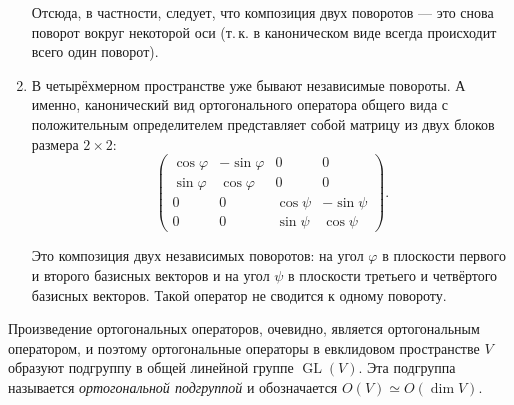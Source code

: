 \begin{example}
\begin{enumerate}
            Отсюда, в частности, следует, что композиция двух поворотов --- это снова поворот вокруг некоторой оси (т.\,к. в каноническом виде всегда происходит всего один поворот).
        \item В четырёхмерном пространстве уже бывают независимые повороты. А именно, канонический вид ортогонального оператора общего вида с положительным определителем представляет собой матрицу из двух блоков размера $2 \times 2$:
            \[
                \begin{pmatrix}
                    \cos\varphi & -\sin\varphi & 0 & 0\\
                    \sin\varphi & \cos\varphi & 0 & 0\\
                    0 & 0 & \cos\psi & -\sin\psi\\
                    0 & 0 & \sin\psi & \cos\psi
                \end{pmatrix}.
            \]

            Это композиция двух независимых поворотов: на угол $\varphi$ в плоскости первого и второго базисных векторов и на угол $\psi$ в плоскости третьего и четвёртого базисных векторов. Такой оператор не сводится к одному повороту.
    \end{enumerate}
\end{example}

Произведение ортогональных операторов, очевидно, является ортогональным оператором, и поэтому ортогональные операторы в евклидовом пространстве $V$ образуют подгруппу в общей линейной группе $\operatorname{GL}(V)$. Эта подгруппа называется \textit{ортогональной подгруппой} и обозначается $O(V) \simeq O(\dim V)$.

